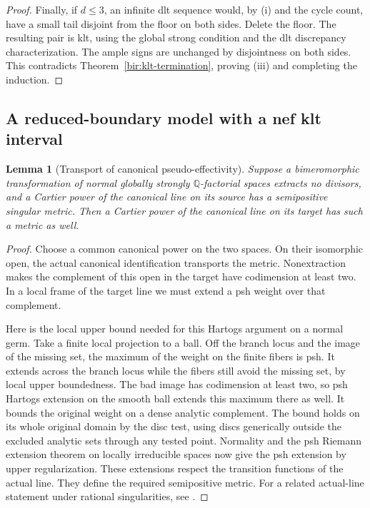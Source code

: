 \documentclass[11pt,letterpaper]{article}
\newcommand{\Q}{\mathbb{Q}}
\newtheorem{lemma}[theorem]{Lemma}
\theoremstyle{definition}
\theoremstyle{remark}
\begin{document}
\begin{proof}
Finally, if $d\leq3$, an infinite dlt sequence would, by (i) and the
cycle count, have a small tail disjoint from the floor on both
sides.  Delete the floor.  The resulting pair is klt, using the
global strong condition and the dlt discrepancy characterization.
The ample signs are unchanged by disjointness on both sides.
This contradicts Theorem~\ref{bir:klt-termination}, proving (iii)
and completing the induction.
\end{proof}

\subsection{A reduced-boundary model with a nef klt interval}
\label{bir:reduced-section}

\begin{lemma}[Transport of canonical pseudo-effectivity]
\label{bir:pseudoeffective-transport}
Suppose a bimeromorphic transformation of normal globally strongly
$\Q$-factorial spaces extracts no divisors, and a Cartier power of
the canonical line on its source has a semipositive singular metric.
Then a Cartier power of the canonical line on its target has such
a metric as well.
\end{lemma}

\begin{proof}
Choose a common canonical power on the two spaces.  On their
isomorphic open, the actual canonical identification transports the
metric.  Nonextraction makes the complement of this open in the
target have codimension at least two.  In a local frame of the
target line we must extend a psh weight over that complement.

Here is the local upper bound needed for this Hartogs argument on a
normal germ.  Take a finite local projection to a ball.  Off the
branch locus and the image of the missing set, the maximum of the
weight on the finite fibers is psh.  It extends across the branch
locus while the fibers still avoid the missing set, by local upper
boundedness.  The bad image has codimension at least two, so psh
Hartogs extension on the smooth ball extends this maximum there as
well.  It bounds the original weight on a dense analytic complement.
The bound holds on its whole original domain by the disc test,
using discs generically outside the excluded analytic sets through
any tested point.  Normality and the psh Riemann extension theorem
on locally irreducible spaces now give the psh extension by upper
regularization.  These extensions respect the transition functions
of the actual line.  They define the required semipositive metric.
For a related actual-line statement under rational singularities,
see \cite[Lemma~3.6]{HLLNonvanishing}.
\end{proof}
\end{document}
